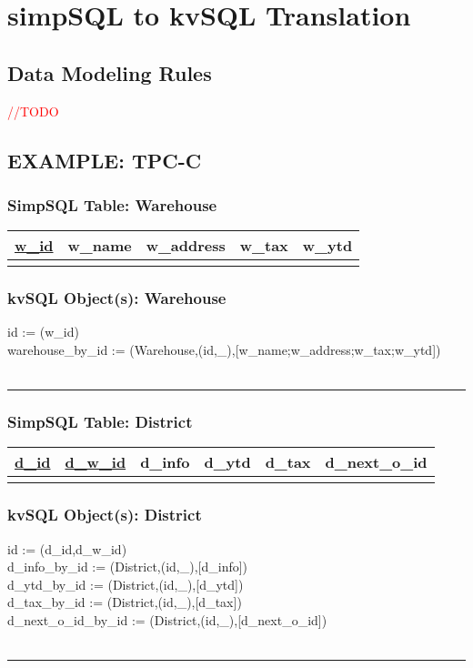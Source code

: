 \documentclass[12pt,letter]{article}
\begin{document}
\section{simpSQL to kvSQL Translation}
\subsection{Data Modeling Rules}
\textcolor{red}{//TODO}
\subsection{EXAMPLE: TPC-C}
\subsubsection*{SimpSQL Table: Warehouse}  
\begin{tabular}{ |c|c|c|c|c| }
 \hline
 \underline{w\_id} & w\_name & w\_address & w\_tax & w\_ytd \\
 \hline
 &   &   & & \\
 \hline
\end{tabular}

\subsubsection*{kvSQL Object(s): Warehouse}  
id := (w\_id) \\
warehouse\_by\_id :=
(Warehouse,(id,\_),[w\_name;w\_address;w\_tax;w\_ytd]) 
\\ \\
\hrule

\subsubsection*{SimpSQL Table: District}  
\begin{tabular}{ |c|c|c|c|c|c| }
 \hline
 \underline{d\_id} & \underline{d\_w\_id} & d\_info & d\_ytd & d\_tax & d\_next\_o\_id\\
 \hline
 &   &   & & &\\
 \hline
\end{tabular}

\subsubsection*{kvSQL Object(s): District}  
 id := (d\_id,d\_w\_id) \\
 d\_info\_by\_id := 
(District,(id,\_),[d\_info])  \\
 d\_ytd\_by\_id := 
(District,(id,\_),[d\_ytd])  \\
 d\_tax\_by\_id := 
(District,(id,\_),[d\_tax])  \\
 d\_next\_o\_id\_by\_id := 
(District,(id,\_),[d\_next\_o\_id])  \\
\\ 
\hrule
\end{document}
